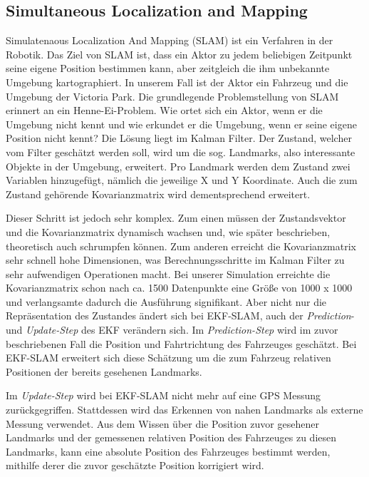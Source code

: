 \documentclass[11pt]{article}
\begin{document}
\subsection{Simultaneous Localization and Mapping}

Simulatenaous Localization And Mapping (SLAM) ist ein Verfahren in der Robotik. Das Ziel von SLAM ist, dass ein Aktor zu jedem beliebigen Zeitpunkt seine eigene Position bestimmen kann, aber zeitgleich die ihm unbekannte Umgebung kartographiert. In unserem Fall ist der Aktor ein Fahrzeug und die Umgebung der Victoria Park. Die grundlegende Problemstellung von SLAM erinnert an ein Henne-Ei-Problem. Wie ortet sich ein Aktor, wenn er die Umgebung nicht kennt und wie erkundet er die Umgebung, wenn er seine eigene Position nicht kennt? 
Die Lösung liegt im Kalman Filter. Der Zustand, welcher vom Filter geschätzt werden soll, wird um die sog. Landmarks, also interessante Objekte in der Umgebung, erweitert. Pro Landmark werden dem Zustand zwei Variablen hinzugefügt, nämlich die jeweilige X und Y Koordinate. Auch die zum Zustand gehörende Kovarianzmatrix wird dementsprechend erweitert.

Dieser Schritt ist jedoch sehr komplex. Zum einen müssen der Zustandsvektor und die Kovarianzmatrix dynamisch wachsen und, wie später beschrieben, theoretisch auch schrumpfen können. Zum anderen erreicht die Kovarianzmatrix sehr schnell hohe Dimensionen, was Berechnungsschritte im Kalman Filter zu sehr aufwendigen Operationen macht. Bei unserer Simulation erreichte die Kovarianzmatrix schon nach ca. 1500 Datenpunkte eine Größe von 1000 x 1000 und verlangsamte dadurch die Ausführung signifikant. 
Aber nicht nur die Repräsentation des Zustandes ändert sich bei EKF-SLAM, auch der \textit{Prediction}- und \textit{Update-Step} des EKF verändern sich. Im \textit{Prediction-Step} wird im zuvor beschriebenen Fall die Position und Fahrtrichtung des Fahrzeuges geschätzt. Bei EKF-SLAM erweitert sich diese Schätzung um die zum Fahrzeug relativen Positionen der bereits gesehenen Landmarks.

Im \textit{Update-Step} wird bei EKF-SLAM nicht mehr auf eine GPS Messung zurückgegriffen. Stattdessen wird das Erkennen von nahen Landmarks als externe Messung verwendet. Aus dem Wissen über die Position zuvor gesehener Landmarks und der gemessenen relativen Position des Fahrzeuges zu diesen Landmarks, kann eine absolute Position des Fahrzeuges bestimmt werden, mithilfe derer die zuvor geschätzte Position korrigiert wird.
\end{document}

